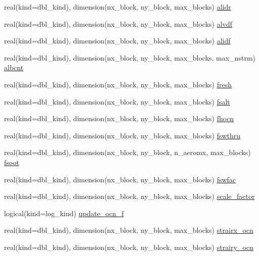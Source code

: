 \begin{DoxyCompactItemize}
\item 
real(kind=dbl\_\-kind), dimension(nx\_\-block, ny\_\-block, max\_\-blocks) \hyperlink{namespaceice__flux_a43c7f22f8888770c074c9affc70d5a6b}{alidr}
\item 
real(kind=dbl\_\-kind), dimension(nx\_\-block, ny\_\-block, max\_\-blocks) \hyperlink{namespaceice__flux_a2cb96fbc3ffddc795321900557ce8ff6}{alvdf}
\item 
real(kind=dbl\_\-kind), dimension(nx\_\-block, ny\_\-block, max\_\-blocks) \hyperlink{namespaceice__flux_a18a9ac0e0bdd270272fbdc48beab2c8e}{alidf}
\item 
real(kind=dbl\_\-kind), dimension(nx\_\-block, ny\_\-block, max\_\-blocks, max\_\-nstrm) \hyperlink{namespaceice__flux_a43a0dd63e5a473c4acb725f534c3192d}{albcnt}
\item 
real(kind=dbl\_\-kind), dimension(nx\_\-block, ny\_\-block, max\_\-blocks) \hyperlink{namespaceice__flux_adbdb875a7e468b890dba7204d972c05a}{fresh}
\item 
real(kind=dbl\_\-kind), dimension(nx\_\-block, ny\_\-block, max\_\-blocks) \hyperlink{namespaceice__flux_a93da98d35da9e23e802edb93bcaf7477}{fsalt}
\item 
real(kind=dbl\_\-kind), dimension(nx\_\-block, ny\_\-block, max\_\-blocks) \hyperlink{namespaceice__flux_ad13e4555d29196de5e5e1130432c5a3a}{fhocn}
\item 
real(kind=dbl\_\-kind), dimension(nx\_\-block, ny\_\-block, max\_\-blocks) \hyperlink{namespaceice__flux_a2b935c4127f16509133036f6cf544794}{fswthru}
\item 
real(kind=dbl\_\-kind), dimension(nx\_\-block, ny\_\-block, n\_\-aeromx, max\_\-blocks) \hyperlink{namespaceice__flux_a7b0cfe6f97cfa89da6c797550ce6c4f0}{fsoot}
\item 
real(kind=dbl\_\-kind), dimension(nx\_\-block, ny\_\-block, max\_\-blocks) \hyperlink{namespaceice__flux_a848ade46ff78dbaa4ff31b24abd7bd3c}{fswfac}
\item 
real(kind=dbl\_\-kind), dimension(nx\_\-block, ny\_\-block, max\_\-blocks) \hyperlink{namespaceice__flux_af1c56f1d4d98b83318a54b61776ea37e}{scale\_\-factor}
\item 
logical(kind=log\_\-kind) \hyperlink{namespaceice__flux_ac97b083c2136cd4e0deb365a3a3f4f6b}{update\_\-ocn\_\-f}
\item 
real(kind=dbl\_\-kind), dimension(nx\_\-block, ny\_\-block, max\_\-blocks) \hyperlink{namespaceice__flux_a95351534eb982b4f0afc45ae4455c392}{strairx\_\-ocn}
\item 
real(kind=dbl\_\-kind), dimension(nx\_\-block, ny\_\-block, max\_\-blocks) \hyperlink{namespaceice__flux_a4e7200c0bea830cf623a6cdf2218cf1c}{strairy\_\-ocn}

\end{DoxyCompactItemize}
